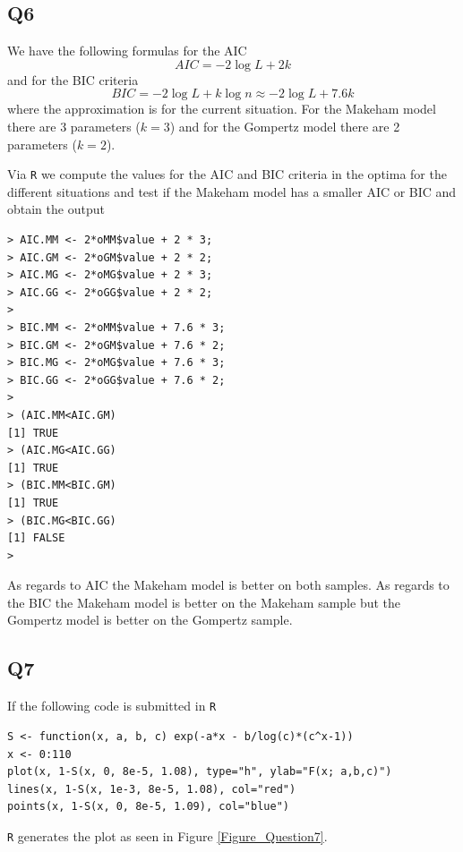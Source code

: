 \subsection*{Q6}

We have the following formulas for the AIC
\begin{equation}
AIC = -2 \log L + 2k
\end{equation}
and for the BIC criteria 
\begin{equation}
BIC = -2 \log L + k \log n \approx -2 \log L + 7.6k
\end{equation}
where the approximation is for the current situation. For the Makeham model there are 3 parameters ($k = 3$) and for the Gompertz model there are 2 parameters ($k=2$).

Via \verb|R| we compute the values for the AIC and BIC criteria in the optima for the different situations and test if the Makeham model has a smaller AIC or BIC and obtain the output
\begin{verbatim}
> AIC.MM <- 2*oMM$value + 2 * 3;
> AIC.GM <- 2*oGM$value + 2 * 2;
> AIC.MG <- 2*oMG$value + 2 * 3;
> AIC.GG <- 2*oGG$value + 2 * 2;
> 
> BIC.MM <- 2*oMM$value + 7.6 * 3;
> BIC.GM <- 2*oGM$value + 7.6 * 2;
> BIC.MG <- 2*oMG$value + 7.6 * 3;
> BIC.GG <- 2*oGG$value + 7.6 * 2;
> 
> (AIC.MM<AIC.GM)
[1] TRUE
> (AIC.MG<AIC.GG)
[1] TRUE
> (BIC.MM<BIC.GM)
[1] TRUE
> (BIC.MG<BIC.GG)
[1] FALSE
> \end{verbatim}

As regards to AIC the Makeham model is better on both samples. As regards to the BIC the Makeham model is better on the Makeham sample but the Gompertz model is better on the Gompertz sample.

\subsection*{Q7}

If the following code is submitted in \verb|R|

\begin{verbatim}
S <- function(x, a, b, c) exp(-a*x - b/log(c)*(c^x-1))
x <- 0:110
plot(x, 1-S(x, 0, 8e-5, 1.08), type="h", ylab="F(x; a,b,c)")
lines(x, 1-S(x, 1e-3, 8e-5, 1.08), col="red")
points(x, 1-S(x, 0, 8e-5, 1.09), col="blue")
\end{verbatim}
\verb|R| generates the plot as seen in Figure \ref{Figure_Question7}.

